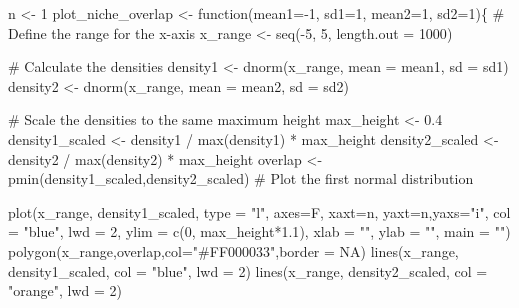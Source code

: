 \documentclass[
  a4paper,
]{scrbook}
\newenvironment{Shaded}{\begin{snugshade}}{\end{snugshade}}
\newcommand{\AttributeTok}[1]{\textcolor[rgb]{0.40,0.45,0.13}{#1}}
\newcommand{\CommentTok}[1]{\textcolor[rgb]{0.37,0.37,0.37}{#1}}
\newcommand{\ConstantTok}[1]{\textcolor[rgb]{0.56,0.35,0.01}{#1}}
\newcommand{\ControlFlowTok}[1]{\textcolor[rgb]{0.00,0.23,0.31}{#1}}
\newcommand{\DecValTok}[1]{\textcolor[rgb]{0.68,0.00,0.00}{#1}}
\newcommand{\FloatTok}[1]{\textcolor[rgb]{0.68,0.00,0.00}{#1}}
\newcommand{\FunctionTok}[1]{\textcolor[rgb]{0.28,0.35,0.67}{#1}}
\newcommand{\NormalTok}[1]{\textcolor[rgb]{0.00,0.23,0.31}{#1}}
\newcommand{\OtherTok}[1]{\textcolor[rgb]{0.00,0.23,0.31}{#1}}
\newcommand{\SpecialCharTok}[1]{\textcolor[rgb]{0.37,0.37,0.37}{#1}}
\newcommand{\StringTok}[1]{\textcolor[rgb]{0.13,0.47,0.30}{#1}}
\theoremstyle{definition}
\theoremstyle{remark}
\begin{document}
\begin{Shaded}
\begin{Highlighting}[]
\NormalTok{n }\OtherTok{\textless{}{-}} \DecValTok{1}
\NormalTok{plot\_niche\_overlap }\OtherTok{\textless{}{-}} \ControlFlowTok{function}\NormalTok{(}\AttributeTok{mean1=}\SpecialCharTok{{-}}\DecValTok{1}\NormalTok{, }\AttributeTok{sd1=}\DecValTok{1}\NormalTok{, }\AttributeTok{mean2=}\DecValTok{1}\NormalTok{, }\AttributeTok{sd2=}\DecValTok{1}\NormalTok{)\{}
  \CommentTok{\# Define the range for the x{-}axis}
\NormalTok{  x\_range }\OtherTok{\textless{}{-}} \FunctionTok{seq}\NormalTok{(}\SpecialCharTok{{-}}\DecValTok{5}\NormalTok{, }\DecValTok{5}\NormalTok{, }\AttributeTok{length.out =} \DecValTok{1000}\NormalTok{)}
  
  \CommentTok{\# Calculate the densities}
\NormalTok{  density1 }\OtherTok{\textless{}{-}} \FunctionTok{dnorm}\NormalTok{(x\_range, }\AttributeTok{mean =}\NormalTok{ mean1, }\AttributeTok{sd =}\NormalTok{ sd1)}
\NormalTok{  density2 }\OtherTok{\textless{}{-}} \FunctionTok{dnorm}\NormalTok{(x\_range, }\AttributeTok{mean =}\NormalTok{ mean2, }\AttributeTok{sd =}\NormalTok{ sd2)}
  
  \CommentTok{\# Scale the densities to the same maximum height}
\NormalTok{  max\_height }\OtherTok{\textless{}{-}} \FloatTok{0.4}
\NormalTok{  density1\_scaled }\OtherTok{\textless{}{-}}\NormalTok{ density1 }\SpecialCharTok{/} \FunctionTok{max}\NormalTok{(density1) }\SpecialCharTok{*}\NormalTok{ max\_height}
\NormalTok{  density2\_scaled }\OtherTok{\textless{}{-}}\NormalTok{ density2 }\SpecialCharTok{/} \FunctionTok{max}\NormalTok{(density2) }\SpecialCharTok{*}\NormalTok{ max\_height}
\NormalTok{  overlap }\OtherTok{\textless{}{-}} \FunctionTok{pmin}\NormalTok{(density1\_scaled,density2\_scaled)}
  \CommentTok{\# Plot the first normal distribution}
  
  \FunctionTok{plot}\NormalTok{(x\_range, density1\_scaled, }\AttributeTok{type =} \StringTok{"l"}\NormalTok{, }
       \AttributeTok{axes=}\NormalTok{F, }\AttributeTok{xaxt=}\StringTok{\textquotesingle{}n\textquotesingle{}}\NormalTok{, }\AttributeTok{yaxt=}\StringTok{\textquotesingle{}n\textquotesingle{}}\NormalTok{,}\AttributeTok{yaxs=}\StringTok{"i"}\NormalTok{,}
       \AttributeTok{col =} \StringTok{"blue"}\NormalTok{, }\AttributeTok{lwd =} \DecValTok{2}\NormalTok{, }\AttributeTok{ylim =} \FunctionTok{c}\NormalTok{(}\DecValTok{0}\NormalTok{, max\_height}\SpecialCharTok{*}\FloatTok{1.1}\NormalTok{), }
       \AttributeTok{xlab =} \StringTok{""}\NormalTok{, }\AttributeTok{ylab =} \StringTok{""}\NormalTok{, }\AttributeTok{main =} \StringTok{""}\NormalTok{)}
  \FunctionTok{polygon}\NormalTok{(x\_range,overlap,}\AttributeTok{col=}\StringTok{"\#FF000033"}\NormalTok{,}\AttributeTok{border =} \ConstantTok{NA}\NormalTok{)}
  \FunctionTok{lines}\NormalTok{(x\_range, density1\_scaled, }\AttributeTok{col =} \StringTok{"blue"}\NormalTok{, }\AttributeTok{lwd =} \DecValTok{2}\NormalTok{)}
  \FunctionTok{lines}\NormalTok{(x\_range, density2\_scaled, }\AttributeTok{col =} \StringTok{"orange"}\NormalTok{, }\AttributeTok{lwd =} \DecValTok{2}\NormalTok{)}
  

\end{Highlighting}
\end{Shaded}
\end{document}
